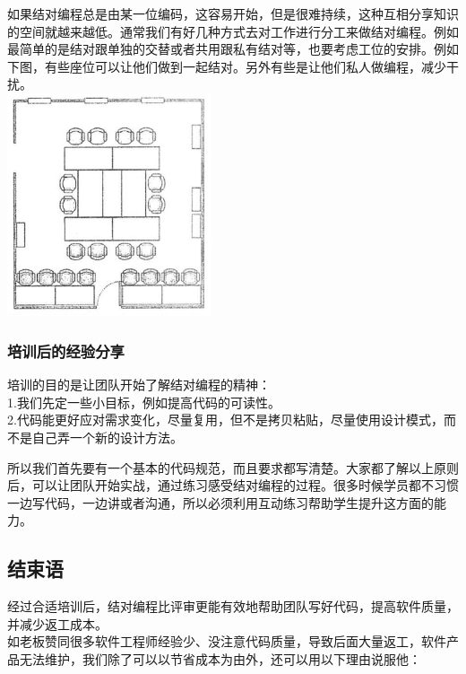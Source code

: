 如果结对编程总是由某一位编码，这容易开始，但是很难持续，这种互相分享知识的空间就越来越低。通常我们有好几种方式去对工作进行分工来做结对编程。例如最简单的是结对跟单独的交替或者共用跟私有结对等，也要考虑工位的安排。例如下图，有些座位可以让他们做到一起结对。另外有些是让他们私人做编程，减少干扰。\\

\includegraphics[width=6cm]{Acp3-131.png}

\hypertarget{ux57f9ux8badux540eux7684ux7ecfux9a8cux5206ux4eab}{%
\subsubsection{培训后的经验分享}\label{ux57f9ux8badux540eux7684ux7ecfux9a8cux5206ux4eab}}

培训的目的是让团队开始了解结对编程的精神：\\
1.我们先定一些小目标，例如提高代码的可读性。\\
2.代码能更好应对需求变化，尽量复用，但不是拷贝粘贴，尽量使用设计模式，而不是自己弄一个新的设计方法。

所以我们首先要有一个基本的代码规范，而且要求都写清楚。大家都了解以上原则后，可以让团队开始实战，通过练习感受结对编程的过程。很多时候学员都不习惯一边写代码，一边讲或者沟通，所以必须利用互动练习帮助学生提升这方面的能力。

\hypertarget{ux603bux7ed3}{%
\subsection{结束语}\label{ux603bux7ed3}}

经过合适培训后，结对编程比评审更能有效地帮助团队写好代码，提高软件质量，并减少返工成本。\\
如老板赞同很多软件工程师经验少、没注意代码质量，导致后面大量返工，软件产品无法维护，我们除了可以以节省成本为由外，还可以用以下理由说服他：

